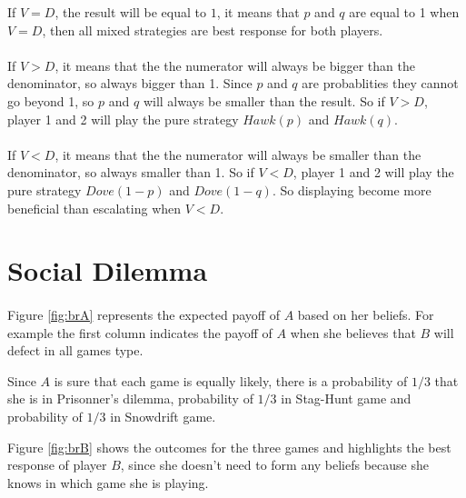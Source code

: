 \documentclass[letterpaper]{article}
\begin{document}
If $V = D$, the result will be equal to $1$, it means that $p$
and $q$ are equal to 1 when $V = D$,
then all mixed strategies are best response for
both players.

\paragraph{}

If $V > D$, it means that the the numerator will always
be bigger than the denominator, so always bigger than 1. Since $p$ and $q$ are
probablities
they cannot go beyond 1, so $p$ and $q$ will always be smaller than
the result. So if $V > D$, player 1 and 2 will play the pure strategy $Hawk(p)$
and $Hawk(q)$.

\paragraph{}

If $V < D$, it means that the the numerator will always
be smaller than the denominator, so always smaller than 1.
So if $V < D$, player 1 and 2 will play the pure strategy $Dove(1 - p)$
and $Dove(1 - q)$. So displaying become more beneficial than escalating when
$V < D$.


\section{Social Dilemma}


\paragraph{}

Figure \ref{fig:brA} represents the expected payoff of $A$ based on her
beliefs. For example the first column indicates the payoff of $A$ when she
believes that $B$ will defect in all games type.

Since $A$ is sure that each game is equally likely, there is a probability of
$1/3$ that she is in Prisonner's dilemma,
probability of $1/3$ in Stag-Hunt game and probability of $1/3$ in Snowdrift
game.

Figure \ref{fig:brB} shows the outcomes for the three games
and highlights the best response of player $B$,
since she doesn't need to form any beliefs because she knows in which game
she is playing.
\end{document}
